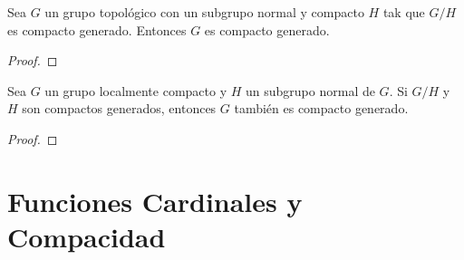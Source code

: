 \documentclass[12pt]{report}
\theoremstyle{largebreak}
\begin{document}
    \begin{theor}
        Sea $G$ un grupo topológico con un subgrupo normal y compacto $H$ tak que $G/H$ es compacto generado. Entonces $G$ es compacto generado.
    \end{theor}

    \begin{proof}
        
    \end{proof}

    \begin{theor}
        Sea $G$ un grupo localmente compacto y $H$ un subgrupo normal de $G$. Si $G/H$ y $H$ son compactos generados, entonces $G$ también es compacto generado.
    \end{theor}

    \begin{proof}
        
    \end{proof}

    \section{Funciones Cardinales y Compacidad}

    \begin{theor}
        
    \end{theor}
\end{document}
